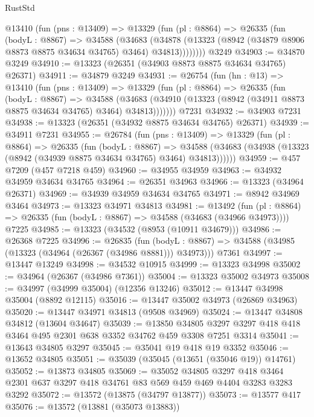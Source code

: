 \begin{lexlean}{RustStd}
\begin{coremodule}
      @13410
        (fun (pns : @13409) =>
        @13329
          (fun (pl : @8864) =>
          @26335
            (fun (bodyL : @8867) =>
            @34588
              (@34683
                (@34878
                  (@13323 (@8942 (@34879 @8906 @8873 @8875 @34634 @34765) @3464) @34813))))))))
    @3249
@34903 := @34870 @3249
@34910 := @13323 (@26351 (@34903 @8873 @8875 @34634 @34765) @26371)
@34911 := @34879 @3249
@34931 := @26754
    (fun (hn : @13) =>
    @13410
      (fun (pns : @13409) =>
      @13329
        (fun (pl : @8864) =>
        @26335
          (fun (bodyL : @8867) =>
          @34588
            (@34683 (@34910 (@13323 (@8942 (@34911 @8873 @8875 @34634 @34765) @3464) @34813)))))))
    @7231
@34932 := @34903 @7231
@34938 := @13323 (@26351 (@34932 @8875 @34634 @34765) @26371)
@34939 := @34911 @7231
@34955 := @26784
    (fun (pns : @13409) =>
    @13329
      (fun (pl : @8864) =>
      @26335
        (fun (bodyL : @8867) =>
        @34588 (@34683 (@34938 (@13323 (@8942 (@34939 @8875 @34634 @34765) @3464) @34813))))))
@34959 := @457 @7209 (@457 @7218 @459)
@34960 := @34955 @34959
@34963 := @34932 @34959 @34634 @34765
@34964 := @26351 @34963
@34966 := @13323 (@34964 @26371)
@34969 := @34939 @34959 @34634 @34765
@34971 := @8942 @34969 @3464
@34973 := @13323 @34971 @34813
@34981 := @13492
    (fun (pl : @8864) => @26335 (fun (bodyL : @8867) => @34588 (@34683 (@34966 @34973))))
    @7225
@34985 := @13323 (@34532 (@8953 (@10911 @34679)))
@34986 := @26368 @7225
@34996 := @26835
    (fun (bodyL : @8867) => @34588 (@34985 (@13323 (@34964 (@26367 (@34986 @8881))) @34973)))
    @7361
@34997 := @13447 @13249
@34998 := @34532 @10915
@34999 := @13323 @34998
@35002 := @34964 (@26367 (@34986 @7361))
@35004 := @13323 @35002 @34973
@35008 := @34997 (@34999 @35004) (@12356 @13246)
@35012 := @13447 @34998 @35004 (@8892 @12115)
@35016 := @13447 @35002 @34973 (@26869 @34963)
@35020 := @13447 @34971 @34813 (@9508 @34969)
@35024 := @13447 @34808 @34812 (@13604 @34647)
@35039 := @13850
    @34805
    @3297
    @3297
    @418
    @418
    @3464
    @495
    @2301
    @638
    @3352
    @34762
    @459
    @3308
    @7251
    @3314
@35041 := @13643 @34805 @3297
@35045 := @35041 @19 @418 @19 @3352
@35046 := @13652 @34805
@35051 := @35039 (@35045 (@13651 (@35046 @19)) @14761)
@35052 := @13873 @34805
@35069 := @35052
    @34805
    @3297
    @418
    @3464
    @2301
    @637
    @3297
    @418
    @34761
    @83
    @569
    @459
    @469
    @4404
    @3283
    @3283
    @3292
@35072 := @13572 (@13875 (@34797 @13877))
@35073 := @13577 @417
@35076 := @13572 (@13881 (@35073 @13883))

\end{coremodule}
\end{lexlean}
